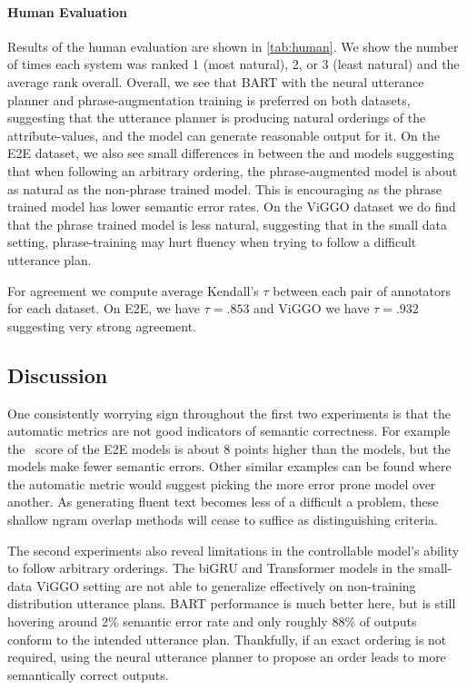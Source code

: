 

\paragraph{Human Evaluation} Results of the human evaluation are shown in
\autoref{tab:human}. We show the number of times each system was ranked 1
(most natural), 2, or 3 (least natural) and the average rank overall.
Overall, we see that BART  with the neural utterance planner 
and phrase-augmentation training is
preferred on both datasets, suggesting that the utterance planner is
producing natural orderings of the attribute-values, and the model can
generate reasonable output for it. On the E2E dataset, we also see small
differences in between the  and  models
suggesting that when following an arbitrary ordering, the phrase-augmented
model is about as natural as the non-phrase trained model. This is encouraging
as the phrase trained model has lower semantic error rates. 
On the ViGGO dataset we do find
that the phrase trained model is less natural, suggesting that in the small
data setting, phrase-training may hurt fluency when trying to follow a
difficult utterance plan.

For agreement we compute average Kendall's $\tau$ between each pair of
annotators for each dataset. On E2E, we have $\tau=.853$ and ViGGO we have
$\tau=.932$ suggesting very strong agreement.

\subsection{Discussion}

One consistently worrying sign throughout the first two experiments is that the
automatic metrics are not good indicators of semantic correctness.  For
example the \rougel~score of the E2E  models is about 8
points higher than the  models, but the 
models make fewer semantic errors. Other similar examples can be found where
the automatic metric would suggest picking the more error prone model over
another. As generating fluent text becomes less of a difficult a problem,
these shallow ngram overlap methods will cease to suffice as distinguishing
criteria.

The second experiments also reveal limitations in the controllable model's
ability to follow arbitrary orderings. The biGRU and Transformer models in the
small-data ViGGO setting are not able to generalize effectively on
non-training distribution utterance plans. BART performance is much
better here, but is still hovering around 2\% semantic error rate and only roughly 88\% of
outputs conform to the intended utterance plan.  Thankfully, if an exact
ordering is not required, using the neural utterance planner to propose an order leads to more
semantically correct outputs.


